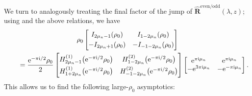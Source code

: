 \documentclass[pdftex]{sigma}
\numberwithin{equation}{section}
\newcommand{\ee}{\mathrm{e}}
\newcommand{\ii}{\mathrm{i}}
\begin{document}
We turn to analogously treating the final factor of the jump of $\hat{\mathbf{R}}^{\mathrm{even/odd}}(\lambda,z)$; using \cite[equation~(10.27.7)]{DLMF} and the above relations, we have
\begin{gather*}
{\rho_0} \begin{bmatrix}I_{2\mu_n - 1}(\rho_0) & I_{1- 2\mu_n}(\rho_0)\vspace{1mm}\\
 -I_{2\mu_n +1}(\rho_0) & -I_{-1-2\mu_n}(\rho_0)\end{bmatrix} \\
 \qquad= \dfrac{\ee^{-\pi \ii/2}\rho_0}{2} \begin{bmatrix} H^{(1)}_{2\mu_n-1}\big(\ee^{-\pi \ii/2} \rho_0\big) & H^{(2)}_{1-2\mu_n}\big(\ee^{-\pi \ii/2} \rho_0\big)\vspace{1mm}\\ H^{(1)}_{1+2\mu_n}\big(\ee^{-\pi \ii/2} \rho_0\big) & H^{(2)}_{-1-2\mu_n}\big(\ee^{-\pi \ii/2} \rho_0\big)\end{bmatrix} \begin{bmatrix} \ee^{\pi \ii \mu_n}& \ee^{\pi \ii \mu_n}\\ - \ee^{3\pi \ii \mu_n} & - \ee^{-\pi \ii \mu_n} \end{bmatrix}.
\end{gather*}
This allows us to find the following large-$\rho_0$ asymptotics:
\end{document}
